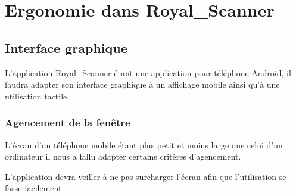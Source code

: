 \documentclass[etudiants]{support-iutrs}
\begin{document}
\section{Ergonomie dans Royal\_Scanner}
\subsection{Interface graphique}
L'application Royal\_Scanner étant une application pour téléphone Android, il faudra adapter son interface graphique à un affichage mobile ainsi qu'à une utilisation tactile.

\subsubsection{Agencement de la fenêtre}
L’écran d'un téléphone mobile étant plus petit et moins large que celui d'un ordinateur il nous a fallu adapter certains critères d'agencement.

L'application devra veiller à ne pas surcharger l'écran afin que l'utilisation se fasse facilement.

  \begin{figure}[h!]
  \begin{center}
    \leavevmode
    \hspace{4cm}
  \end{center}
\end{figure}
\end{document}
